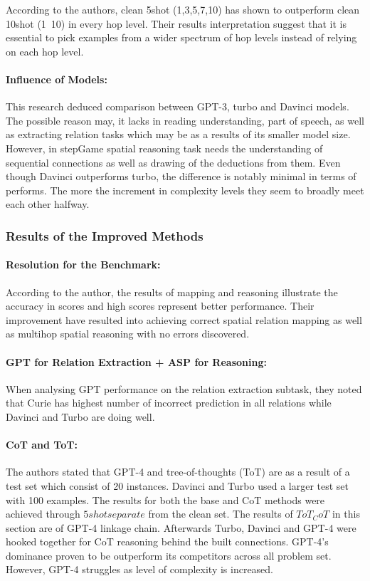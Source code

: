 \documentclass{article}
\begin{document}
According to the authors, clean 5shot (1,3,5,7,10) has shown to outperform clean 10shot (1~10) in every hop level. Their results interpretation suggest that it is essential to pick examples from a wider spectrum of hop levels instead of relying on each hop level.

\paragraph{Influence of Models:} This research deduced comparison between GPT-3, turbo and Davinci models. The possible reason may, it lacks in reading understanding, part of speech, as well as extracting relation tasks which may be as a results of its smaller model size. However, in stepGame spatial reasoning task needs the understanding of sequential connections as well as drawing of the deductions from them. Even though Davinci outperforms turbo, the difference is notably minimal in terms of performs. The more the increment in complexity levels they seem to broadly meet each other halfway.

\subsubsection{Results of the Improved Methods}

\paragraph{Resolution for the Benchmark:} According to the author, the results of mapping and reasoning illustrate the accuracy in scores and high scores represent better performance. Their improvement have resulted into achieving correct spatial relation mapping as well as multihop spatial reasoning with no errors discovered.

\paragraph{GPT for Relation Extraction + ASP for Reasoning:} When analysing GPT performance on the relation extraction subtask, they noted that Curie has highest number of incorrect prediction in all relations while Davinci and Turbo are doing well. 


\paragraph{CoT and ToT:} The authors stated that GPT-4 and tree-of-thoughts (ToT) are as a result of a test set which consist of 20 instances. Davinci and Turbo used a larger test set with 100 examples. The results for both the base and CoT methods were achieved through $5shot separate$ from the clean set. The results of $ToT_CoT$ in this section are of GPT-4 linkage chain. Afterwards Turbo, Davinci and GPT-4 were hooked together for CoT reasoning behind the built connections. GPT-4's dominance proven to be outperform its competitors across all problem set. However, GPT-4 struggles as level of complexity is increased. 
\end{document}

